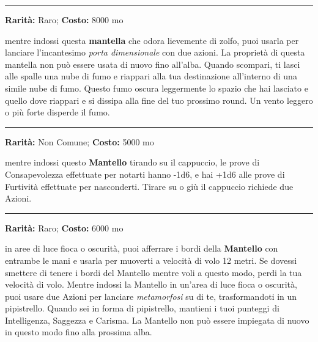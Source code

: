 \begin{multicols}{2}
\smallskip\noindent\rule{\linewidth}{2pt}  \hypertarget{MantelladelCiarlatano}{}\smallskip{}\noindent\label{MantelladelCiarlatano}

\textbf{Rarità:} Raro; \textbf{Costo:} 8000 mo

mentre indossi questa \textbf{mantella} che odora lievemente di zolfo, puoi usarla per lanciare l'incantesimo \emph{porta dimensionale} con due azioni. La proprietà di questa mantella non può essere usata di nuovo fino all'alba. Quando scompari, ti lasci alle spalle una nube di fumo e riappari alla tua destinazione all'interno di una simile nube di fumo. Questo fumo oscura leggermente lo spazio che hai lasciato e quello dove riappari e si dissipa alla fine del tuo prossimo round. Un vento leggero o più forte disperde il fumo.

\smallskip\noindent\rule{\linewidth}{2pt}  \hypertarget{MantellodegliElfi}{}\smallskip{}\noindent\label{MantellodegliElfi}

\textbf{Rarità:} Non Comune; \textbf{Costo:} 5000 mo

mentre indossi questo \textbf{Mantello} tirando su il cappuccio, le prove di Consapevolezza effettuate per notarti hanno -1d6, e hai +1d6 alle prove di Furtività effettuate per nasconderti. Tirare su o giù il cappuccio richiede due Azioni.

\smallskip\noindent\rule{\linewidth}{2pt}  \hypertarget{MantellodelPipistrello}{}\smallskip{}\noindent\label{MantellodelPipistrello}

\textbf{Rarità:} Raro; \textbf{Costo:} 6000 mo

in aree di luce fioca o oscurità, puoi afferrare i bordi della \textbf{Mantello} con entrambe le mani e usarla per muoverti a velocità di volo 12 metri. Se dovessi smettere di tenere i bordi del Mantello mentre voli a questo modo, perdi la tua velocità di volo. Mentre indossi la Mantello in un'area di luce fioca o oscurità, puoi usare due Azioni per lanciare \emph{metamorfosi} su di te, trasformandoti in un pipistrello. Quando sei in forma di pipistrello, mantieni i tuoi punteggi di Intelligenza, Saggezza e Carisma. La Mantello non può essere impiegata di nuovo in questo modo fino alla prossima alba.


\end{multicols}
